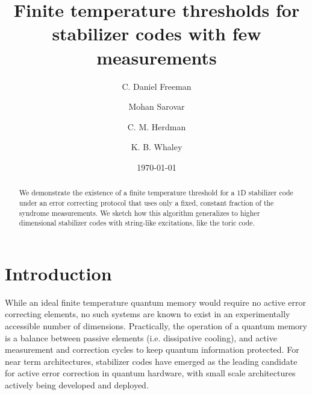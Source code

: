 \documentclass[twocolumn,superscriptaddress,aps,prb,floatfix]{revtex4-1}
\begin{document}

\title{Finite temperature thresholds for stabilizer codes with few measurements}


\author{C. Daniel Freeman}

\author{Mohan Sarovar}

\author{C. M. Herdman}

\author{K. B. Whaley}

\date{\today}

\begin{abstract}
 We demonstrate the existence of a finite temperature threshold for a 1D stabilizer code under an error correcting protocol that uses only a fixed, constant fraction of the syndrome measurements.  We sketch how this algorithm generalizes to higher dimensional stabilizer codes with string-like excitations, like the toric code. 
\end{abstract}

\maketitle

\section{Introduction}
\label{sec:Intro}

 While an ideal finite temperature quantum memory would require no active error correcting elements, no such systems are known to exist in an experimentally accessible number of dimensions.  Practically, the operation of a quantum memory is a balance between passive elements (i.e. dissipative cooling), and active measurement and correction cycles to keep quantum information protected.  For near term architectures, stabilizer codes\cite{Gottesman98} have emerged as the leading candidate for active error correction in quantum hardware, with small scale architectures actively being developed and deployed\cite{all the stabilizers}.
 
\end{document}
